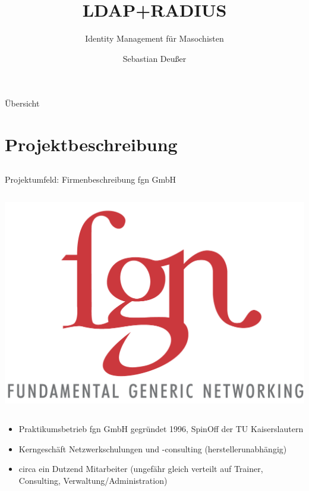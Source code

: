 \documentclass[handout,svgnames]{beamer}
\title[OpenLDAP- und FreeRADIUS-Server]   %
{LDAP+RADIUS}
\subtitle
{Identity Management für Masochisten} %
\author %
{Sebastian Deußer}
\begin{document}
\setcounter{framenumber}{-1}
{
\frame{\titlepage}
}


\section{}
\begin{frame}{Übersicht}
\tableofcontents
\end{frame}
\note{}


\section{Projektbeschreibung}
\subsection{}
\begin{frame}{Projektumfeld: Firmenbeschreibung fgn GmbH}
\begin{columns}[c]
	\begin{column}{2.5cm}
		\includegraphics[scale=0.7]{Bilder/logo_fgn.png}
	\end{column}
\end{columns}
\begin{itemize}
	\item Praktikumsbetrieb fgn GmbH gegründet 1996, SpinOff der TU Kaiserslautern
	\item Kerngeschäft Netzwerkschulungen und -consulting (herstellerunabhängig)
	\item circa ein Dutzend Mitarbeiter (ungefähr gleich verteilt auf Trainer, Consulting, Verwaltung/Administration)

\end{itemize}
\end{frame}
\end{document}
